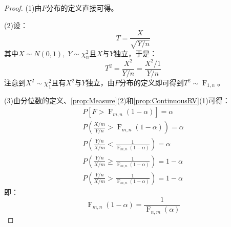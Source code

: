 \begin{proof}
	(1)由$F$分布的定义直接可得。\par
	(2)设：
	\begin{equation*}
		T=\frac{X}{\sqrt{Y/n}}
	\end{equation*}
	其中$X\sim N(0,1),\;Y\sim\chi_n^2$且$X$与$Y$独立，于是：
	\begin{equation*}
		T^2=\frac{X^2}{Y/n}=\frac{X^2/1}{Y/n}
	\end{equation*}
	注意到$X^2\sim\chi_1^2$且有$X^2$与$Y$独立，由$F$分布的定义即可得到$T^2\sim \operatorname{F}_{1,n}$。\par
	(3)由分位数的定义、\cref{prop:Measure}(2)和\cref{prop:ContinuousRV}(1)可得：
	\begin{gather*}
		P[F>\operatorname{F}_{m,n}(1-\alpha)]=\alpha \\
		P\left(\frac{X/m}{Y/n}>\operatorname{F}_{m,n}(1-\alpha)\right)=\alpha \\
		P\left(\frac{Y/n}{X/m}<\frac{1}{\operatorname{F}_{m,n}(1-\alpha)}\right)=\alpha \\
		P\left(\frac{Y/n}{X/m}\geqslant\frac{1}{\operatorname{F}_{m,n}(1-\alpha)}\right)=1-\alpha \\
		P\left(\frac{Y/n}{X/m}>\frac{1}{\operatorname{F}_{m,n}(1-\alpha)}\right)=1-\alpha
	\end{gather*}
	即：
	\begin{equation*}
		\operatorname{F}_{m,n}(1-\alpha)=\frac{1}{\operatorname{F}_{n,m}(\alpha)}
	\end{equation*}
\end{proof}
